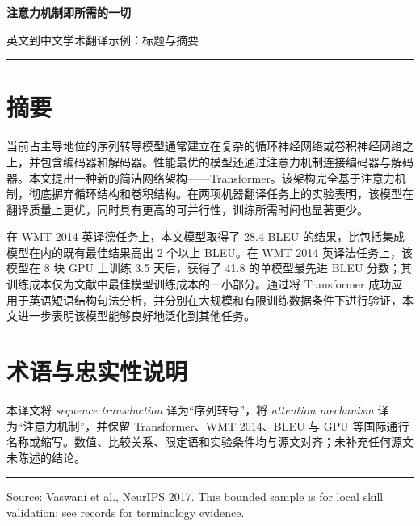 \documentclass[11pt]{ctexart}
\begin{document}
\begin{center}
{\LARGE\bfseries 注意力机制即所需的一切\par}
\vspace{0.45em}
{\large 英文到中文学术翻译示例：标题与摘要\par}
\vspace{0.8em}
\rule{0.72\linewidth}{0.4pt}
\end{center}

\section*{摘要}

当前占主导地位的序列转导模型通常建立在复杂的循环神经网络或卷积神经网络之上，并包含编码器和解码器。性能最优的模型还通过注意力机制连接编码器与解码器。本文提出一种新的简洁网络架构——Transformer。该架构完全基于注意力机制，彻底摒弃循环结构和卷积结构。在两项机器翻译任务上的实验表明，该模型在翻译质量上更优，同时具有更高的可并行性，训练所需时间也显著更少。

在 WMT 2014 英译德任务上，本文模型取得了 28.4 BLEU 的结果，比包括集成模型在内的既有最佳结果高出 2 个以上 BLEU。在 WMT 2014 英译法任务上，该模型在 8 块 GPU 上训练 3.5 天后，获得了 41.8 的单模型最先进 BLEU 分数；其训练成本仅为文献中最佳模型训练成本的一小部分。通过将 Transformer 成功应用于英语短语结构句法分析，并分别在大规模和有限训练数据条件下进行验证，本文进一步表明该模型能够良好地泛化到其他任务。

\section*{术语与忠实性说明}

本译文将 \emph{sequence transduction} 译为“序列转导”，将 \emph{attention mechanism} 译为“注意力机制”，并保留 Transformer、WMT 2014、BLEU 与 GPU 等国际通行名称或缩写。数值、比较关系、限定语和实验条件均与源文对齐；未补充任何源文未陈述的结论。

\vfill
\noindent\rule{\linewidth}{0.4pt}\par
\noindent\small Source: Vaswani et al., NeurIPS 2017. This bounded sample is for local skill validation; see records for terminology evidence.
\end{document}

